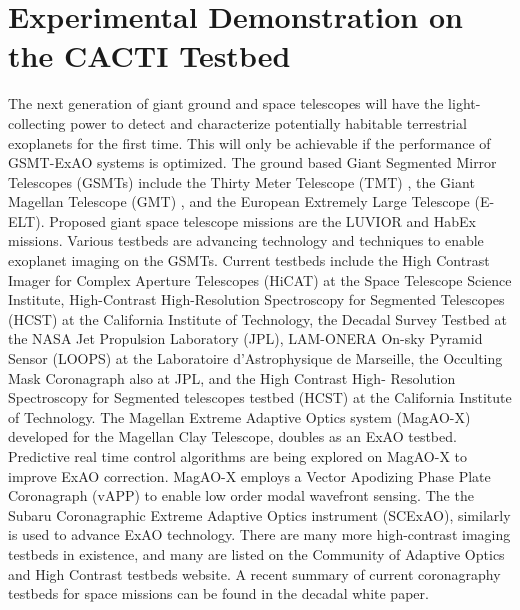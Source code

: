 \chapter{Experimental Demonstration on the CACTI Testbed}\label{CH5}

The next generation of giant ground and space telescopes will have the light-collecting power to detect and characterize potentially habitable terrestrial exoplanets for the first time. This will only be achievable if the performance of GSMT-ExAO systems is optimized. The ground based Giant Segmented Mirror Telescopes (GSMTs) include the Thirty Meter Telescope (TMT) \cite{chisholm2020thirty}, the Giant Magellan Telescope (GMT) \cite{fanson2020overview}, and the European Extremely Large Telescope (E-ELT)\cite{ramsay2020eso}. Proposed giant space telescope missions are the LUVIOR\cite{2020AAS...23544704O} and HabEx\cite{gaudi2020habitable} missions. Various testbeds are advancing technology and techniques to enable exoplanet imaging on the GSMTs. Current testbeds include the High Contrast Imager for Complex Aperture Telescopes (HiCAT)\cite{2014SPIE.9143E..27N} at the Space Telescope Science Institute,  High-Contrast High-Resolution Spectroscopy for Segmented Telescopes (HCST)\cite{jovanovic2018high} at the California Institute of Technology, the Decadal Survey Testbed\cite{belikov2014ames} at the NASA Jet Propulsion Laboratory (JPL), LAM-ONERA On-sky Pyramid Sensor (LOOPS)\cite{janin2019adaptive} at the Laboratoire d'Astrophysique de Marseille, the Occulting Mask Coronagraph\cite{shi2017dynamic} also at JPL, and the High Contrast High- Resolution Spectroscopy for Segmented telescopes testbed (HCST)\cite{jovanovic2018high} at the California Institute of Technology. The Magellan Extreme Adaptive Optics system (MagAO-X)\cite{males2020magao} developed for the Magellan Clay Telescope, doubles as an ExAO testbed. Predictive real time control algorithms are being explored on MagAO-X to improve ExAO correction.\cite{haffert2021data} MagAO-X employs a Vector Apodizing Phase Plate Coronagraph (vAPP)\cite{snik2012vector} to enable low order modal wavefront sensing.\cite{2019JATIS...5d9004M} The the Subaru Coronagraphic Extreme Adaptive Optics instrument (SCExAO)\cite{jovanovic2015subaru}, similarly is used to advance ExAO technology. There are many more high-contrast imaging testbeds in existence, and many are listed on the Community of Adaptive Optics and High Contrast testbeds website\cite{CHAOTIC}. A recent summary of current coronagraphy testbeds for space missions can be found in the decadal white paper.\cite{mazoyer2019high}

